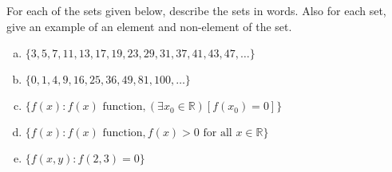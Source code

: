 \documentclass[11pt,letterpaper]{article}
\begin{document}
\newpage



 For each of the sets given below, describe the sets in words. Also for each set, give an example of an element and non-element of the set.
	\begin{enumerate}[(a)]
	\item $\{ 3, 5, 7, 11, 13, 17, 19, 23, 29, 31, 37, 41, 43, 47, \ldots \}$
	\item $\{ 0, 1, 4, 9, 16, 25, 36, 49, 81, 100, \ldots \}$
	\item $\{ f(x) \colon f(x) \text{ function}, ( \exists x_0 \in \mathbb{R} ) [f(x_0)= 0] \}$
	\item $\{ f(x) \colon f(x) \text{ function}, f(x) > 0 \text{ for all } x \in \mathbb{R} \}$
	\item $\{ f(x, y) \colon f(2, 3)= 0 \}$
	\end{enumerate} 
\end{document}
